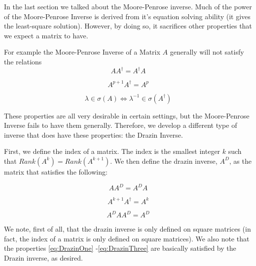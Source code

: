 

In the last section we talked about the Moore-Penrose inverse. Much of the power of the Moore-Penrose Inverse is derived from it's equation solving ability (it gives the least-square solution). However, by doing so, it sacrifices other properties that we expect a matrix to have.

For example the Moore-Penrose Inverse of a Matrix $A$ generally will not satisfy the relations
\begin{equation} \label{eq:DrazinOne}
A A^\dagger = A^\dagger A
\end{equation}

\begin{equation} \label{eq:DrazinTwo}
A^{p+1} A^\dagger = A^p
\end{equation}

\begin{equation} \label{eq:DrazinThree}
\lambda \in \sigma(A) \iff \lambda^{-1} \in \sigma(A^\dagger)
\end{equation}

These properties are all very desirable in certain settings, but the Moore-Penrose Inverse fails to have them generally. Therefore, we develop a different type of inverse that does have these properties: the Drazin Inverse.

First, we define the index of a matrix. The index is the smallest integer $k$ such that $Rank(A^k) = Rank(A^{k+1})$. We then define the drazin inverse, $A^D$, as the matrix that satisfies the following:

\begin{equation} \label{eq:DrazinCondOne}
A A^D = A^D A
\end{equation}

\begin{equation} \label{eq:DrazinCondTwo}
A^{k+1} A^\dagger = A^k
\end{equation}

\begin{equation} \label{eq:DrazinCondThree}
A^D A A^D = A^D
\end{equation}

We note, first of all, that the drazin inverse is only defined on square matrices (in fact, the index of a matrix is only defined on square matrices). We also note that the properties \ref{eq:DrazinOne} -\ref{eq:DrazinThree} are basically satisfied by the Drazin inverse, as desired.

